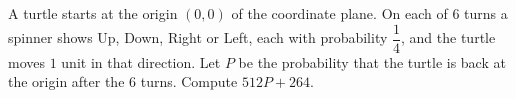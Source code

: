 A turtle starts at the origin $(0,0)$ of the coordinate plane. On each of $6$ turns a spinner shows Up, Down, Right or Left, each with probability $\dfrac{1}{4}$, and the turtle moves $1$ unit in that direction. Let $P$ be the probability that the turtle is back at the origin after the $6$ turns. Compute $512P+264$.
